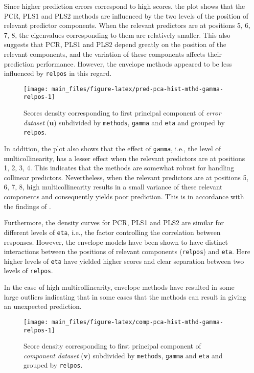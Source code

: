 \documentclass[review]{elsarticle}
\begin{document}
Since higher prediction errors correspond to high scores, the plot shows
that the PCR, PLS1 and PLS2 methods are influenced by the two levels of
the position of relevant predictor components. When the relevant
predictors are at positions 5, 6, 7, 8, the eigenvalues corresponding to
them are relatively smaller. This also suggests that PCR, PLS1 and PLS2
depend greatly on the position of the relevant components, and the
variation of these components affects their prediction performance.
However, the envelope methods appeared to be less influenced by
\texttt{relpos} in this regard.






\begin{figure}[!htb]
\texttt{[image: main\_files/figure-latex/pred-pca-hist-mthd-gamma-relpos-1]} \caption{Scores density corresponding to first principal
component of \emph{error dataset} (\(\mathbf{u}\)) subdivided by
\texttt{methods}, \texttt{gamma} and \texttt{eta} and grouped by
\texttt{relpos}.}\label{fig:pred-pca-hist-mthd-gamma-relpos}
\end{figure}

In addition, the plot also shows that the effect of \texttt{gamma},
i.e., the level of multicollinearity, has a lesser effect when the
relevant predictors are at positions 1, 2, 3, 4. This indicates that the
methods are somewhat robust for handling collinear predictors.
Nevertheless, when the relevant predictors are at positions 5, 6, 7, 8,
high multicollinearity results in a small variance of these relevant
components and consequently yields poor prediction. This is in
accordance with the findings of \citet{Helland1994b}.

Furthermore, the density curves for PCR, PLS1 and PLS2 are similar for
different levels of \texttt{eta}, i.e., the factor controlling the
correlation between responses. However, the envelope models have been
shown to have distinct interactions between the positions of relevant
components (\texttt{relpos}) and \texttt{eta}. Here higher levels of
\texttt{eta} have yielded higher scores and clear separation between two
levels of \texttt{relpos}.

In the case of high multicollinearity, envelope methods have resulted in
some large outliers indicating that in some cases that the methods can
result in giving an unexpected prediction.






\begin{figure}[!htb]
\texttt{[image: main\_files/figure-latex/comp-pca-hist-mthd-gamma-relpos-1]} \caption{Score density corresponding to first principal component
of \emph{component dataset} (\(\mathbf{v}\)) subdivided by
\texttt{methods}, \texttt{gamma} and \texttt{eta} and grouped by
\texttt{relpos}.}\label{fig:comp-pca-hist-mthd-gamma-relpos}
\end{figure}
\end{document}
